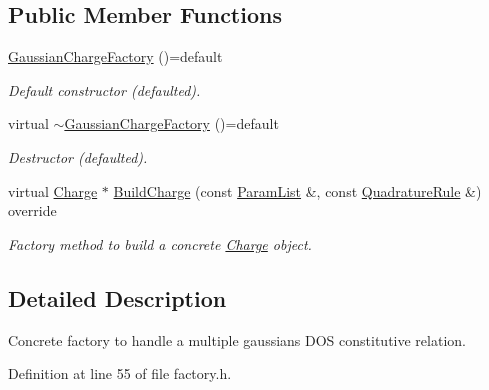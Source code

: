 \subsection*{Public Member Functions}
\begin{DoxyCompactItemize}
\item 
\hypertarget{classGaussianChargeFactory_aedb4a8bbdd1d9723ea5e732053fa8ffe}{\hyperlink{classGaussianChargeFactory_aedb4a8bbdd1d9723ea5e732053fa8ffe}{Gaussian\-Charge\-Factory} ()=default}\label{classGaussianChargeFactory_aedb4a8bbdd1d9723ea5e732053fa8ffe}

\begin{DoxyCompactList}\small\item\em Default constructor (defaulted). \end{DoxyCompactList}\item 
\hypertarget{classGaussianChargeFactory_a13ba2c7152c6f6c358afd62071c6e08b}{virtual \hyperlink{classGaussianChargeFactory_a13ba2c7152c6f6c358afd62071c6e08b}{$\sim$\-Gaussian\-Charge\-Factory} ()=default}\label{classGaussianChargeFactory_a13ba2c7152c6f6c358afd62071c6e08b}

\begin{DoxyCompactList}\small\item\em Destructor (defaulted). \end{DoxyCompactList}\item 
virtual \hyperlink{classCharge}{Charge} $\ast$ \hyperlink{classGaussianChargeFactory_a1e1718ca16c1624e98865bc6359c2136}{Build\-Charge} (const \hyperlink{classParamList}{Param\-List} \&, const \hyperlink{classQuadratureRule}{Quadrature\-Rule} \&) override
\begin{DoxyCompactList}\small\item\em Factory method to build a concrete \hyperlink{classCharge}{Charge} object. \end{DoxyCompactList}\end{DoxyCompactItemize}


\subsection{Detailed Description}
Concrete factory to handle a multiple gaussians D\-O\-S constitutive relation. 

Definition at line 55 of file factory.\-h.



